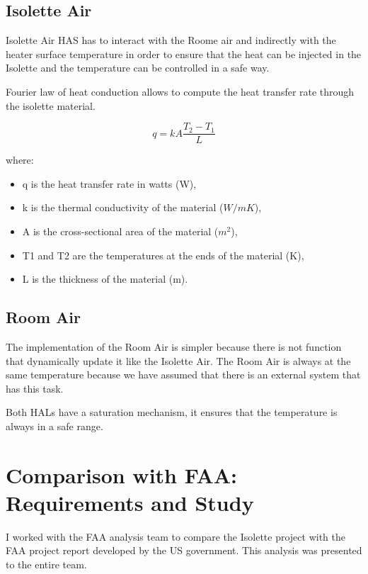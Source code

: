 \documentclass[a4paper, 12pt]{article}
\begin{document}
\subsection{Isolette Air}

Isolette Air HAS has to interact with the Roome air and indirectly with the heater surface temperature in order to ensure
that the heat can be injected in the Isolette and the temperature can be controlled in a safe way.

Fourier law of heat conduction allows to compute the heat transfer rate through the isolette material.

\begin{equation}
q = k A \frac{T_2 - T_1}{L}
\end{equation}

where:
\begin{itemize}
    \item q is the heat transfer rate in watts (W),
    \item k is the thermal conductivity of the material (\( W/mK \)),
    \item A is the cross-sectional area of the material (\( m^2 \)),
    \item T1 and T2 are the temperatures at the ends of the material (K),
    \item L is the thickness of the material (m).
\end{itemize}

\subsection{Room Air}

The implementation of the Room Air is simpler because there is not function that dynamically update it like the Isolette Air.
The Room Air is always at the same temperature because we have assumed that there is an external system that has this task.

Both HALs have a saturation mechanism, it ensures that the temperature is always in a safe range.

\section{Comparison with FAA: Requirements and Study}

I worked with the FAA analysis team to compare the Isolette project with the FAA project report developed by the US government. This analysis was presented to the entire team.
\end{document}
